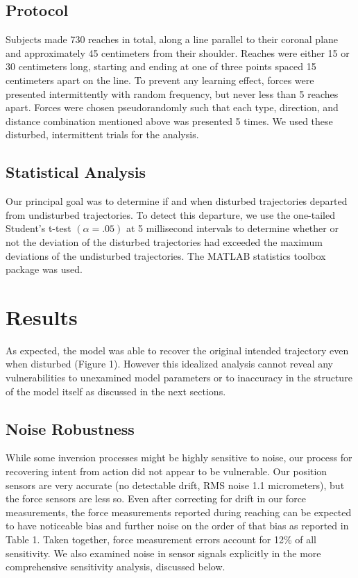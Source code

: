 \subsection*{Protocol}
Subjects made 730 reaches in total, along a line parallel to their coronal plane and approximately 45 centimeters from their shoulder. Reaches were either 15 or 30 centimeters long, starting and ending at one of three points spaced 15 centimeters apart on the line. To prevent any learning effect, forces were presented intermittently with random frequency, but never less than 5 reaches apart. Forces were chosen pseudorandomly such that each type, direction, and distance combination mentioned above was presented 5 times. We used these disturbed, intermittent trials for the analysis. 

\subsection*{Statistical Analysis}
Our principal goal was to determine if and when disturbed trajectories departed from undisturbed trajectories. To detect this departure, we use the one-tailed Student's t-test $(\alpha=.05)$ at 5 millisecond intervals to determine whether or not the deviation of the disturbed trajectories had exceeded the maximum deviations of the undisturbed trajectories. The MATLAB statistics toolbox package \cite{MATLAB:2008} was used.

\section*{Results}
As expected, the model was able to recover the original intended trajectory even when disturbed (Figure 1). However this idealized analysis cannot reveal any vulnerabilities to unexamined model parameters or to inaccuracy in the structure of the model itself as discussed in the next sections.

\subsection*{Noise Robustness}
While some inversion processes might be highly sensitive to noise, our process for recovering intent from action did not appear to be vulnerable. Our position sensors are very accurate (no detectable drift, RMS noise 1.1 micrometers), but the force sensors are less so. Even after correcting for drift in our force measurements, the force measurements reported during reaching can be expected to have noticeable bias and further noise on the order of that bias as reported in Table 1. Taken together, force measurement errors account for 12\% of all sensitivity. We also examined noise in sensor signals explicitly in the more comprehensive sensitivity analysis, discussed below.

